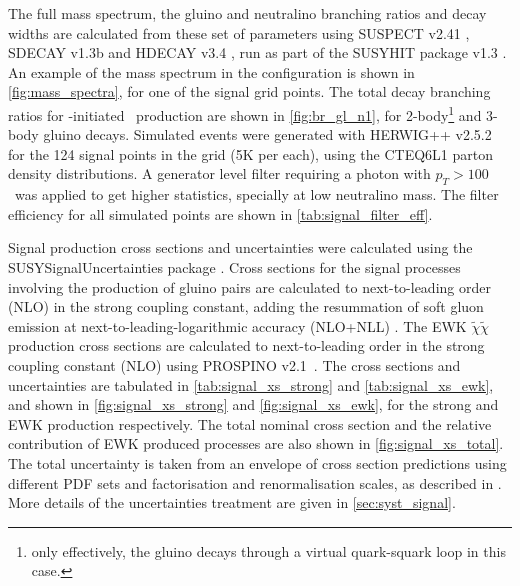 The full mass spectrum, the gluino and neutralino branching ratios and decay widths are calculated from
these set of parameters using SUSPECT v2.41 \cite{Djouadi2007426}, SDECAY v1.3b \cite{Muhlleitner:2004mka}
and HDECAY v3.4 \cite{Djouadi:1997yw}, run as part of the SUSYHIT package v1.3 \cite{Djouadi:2006bz}.
An example of the mass spectrum in the configuration is shown in \Fig \ref{fig:mass_spectra}, for one of
the signal grid points. The total decay branching ratios for \gluino-initiated \ninoone\ production are
shown in \Fig \ref{fig:br_gl_n1}, for 2-body\footnote{only effectively, the gluino decays through a virtual
quark-squark loop in this case.} and 3-body gluino decays.
Simulated events were generated with HERWIG++ v2.5.2 \cite{Bahr:2008pv} for the 124 signal points in the
grid (5K per each), using the CTEQ6L1 \cite{Nadolsky:2008zw} parton density distributions. A generator level
filter requiring a photon with $p_{T}>100~$ \gev\ was applied to get higher statistics, specially at low neutralino
mass. The filter efficiency for all simulated points are shown in \Tab \ref{tab:signal_filter_eff}.

Signal production cross sections and uncertainties were calculated using the SUSYSignalUncertainties package \cite{SUSYsigunc}. Cross sections
for the signal processes involving the production of gluino pairs are calculated to next-to-leading order (NLO)
in the strong coupling constant, adding the resummation of soft gluon emission at next-to-leading-logarithmic
accuracy (NLO+NLL) \cite{Beenakker:1996ch,Kulesza:2008jb,Kulesza:2009kq,Beenakker:2009ha,Beenakker:2011fu}.
The EWK $\tilde{\chi}\tilde{\chi}$ production cross sections are calculated to next-to-leading order in the strong coupling constant (NLO) using PROSPINO v2.1~\cite{Beenakker:1999xh}.
The cross sections and uncertainties are tabulated in \Tab \ref{tab:signal_xs_strong} and \ref{tab:signal_xs_ewk}, and shown in \Fig \ref{fig:signal_xs_strong} and \ref{fig:signal_xs_ewk}, for the strong and EWK production respectively.
The total nominal cross section and the relative contribution of EWK produced processes are also shown in \Fig \ref{fig:signal_xs_total}.
The total uncertainty is taken from an envelope of cross section predictions using different PDF sets and factorisation and renormalisation scales, as described in \Ref \cite{Kramer:2012bx}. More details of the uncertainties treatment are given in \Sec \ref{sec:syst_signal}. %

